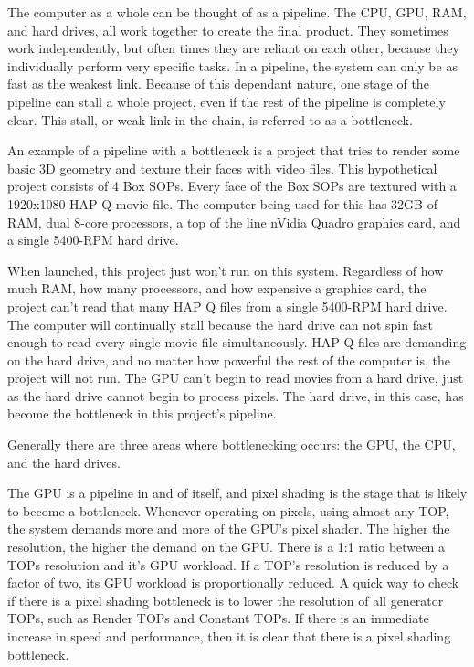 \begin{fullwidth}

The computer as a whole can be thought of as a pipeline. The CPU, GPU, RAM, and hard drives, all work together to create the final product. They sometimes work independently, but often times they are reliant on each other, because they individually perform very specific tasks. In a pipeline, the system can only be as fast as the weakest link. Because of this dependant nature, one stage of the pipeline can stall a whole project, even if the rest of the pipeline is completely clear. This stall, or weak link in the chain, is referred to as a bottleneck.

An example of a pipeline with a bottleneck is a project that tries to render some basic 3D geometry and texture their faces with video files. This hypothetical project consists of 4 Box SOPs. Every face of the Box SOPs are textured with a 1920x1080 HAP Q movie file. The computer being used for this has 32GB of RAM, dual 8-core processors, a top of the line nVidia Quadro graphics card, and a single 5400-RPM hard drive.

When launched, this project just won't run on this system. Regardless of how much RAM, how many processors, and how expensive a graphics card, the project can't read that many HAP Q files from a single 5400-RPM hard drive. The computer will continually stall because the hard drive can not spin fast enough to read every single movie file simultaneously. HAP Q files are demanding on the hard drive, and no matter how powerful the rest of the computer is, the project will not run. The GPU can't begin to read movies from a hard drive, just as the hard drive cannot begin to process pixels. The hard drive, in this case, has become the bottleneck in this project's pipeline.

Generally there are three areas where bottlenecking occurs: the GPU, the CPU, and the hard drives.

The GPU is a pipeline in and of itself, and pixel shading is the stage that is likely to become a bottleneck. Whenever operating on pixels, using almost any TOP, the system demands more and more of the GPU's pixel shader. The higher the resolution, the higher the demand on the GPU. There is a 1:1 ratio between a TOPs resolution and it's GPU workload. If a TOP's resolution is reduced by a factor of two, its GPU workload is proportionally reduced. A quick way to check if there is a pixel shading bottleneck is to lower the resolution of all generator TOPs, such as Render TOPs and Constant TOPs. If there is an immediate increase in speed and performance, then it is clear that there is a pixel shading bottleneck. 


\end{fullwidth}
